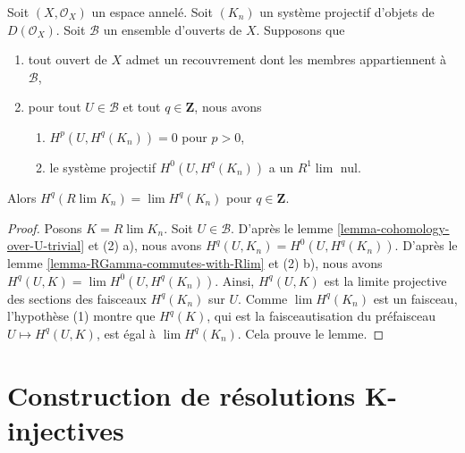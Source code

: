 \begin{lemma}

\label{lemma-derived-limit-suitable-system}

Soit $(X, \mathcal{O}_X)$ un espace annelé. Soit $(K_n)$
un système projectif d'objets de $D(\mathcal{O}_X)$. Soit $\mathcal{B}$ un ensemble d'ouverts de $X$. Supposons que

\begin{enumerate}

\item tout ouvert de $X$ admet un recouvrement dont les membres appartiennent à $\mathcal{B}$,
\item pour tout $U \in \mathcal{B}$ et tout $q \in \mathbf{Z}$, nous avons

\begin{enumerate}

\item  $H^p(U, H^q(K_n)) = 0$ pour $p > 0$,
\item le système projectif $H^0(U, H^q(K_n))$ a un $R^1\lim$ nul.

\end{enumerate}

\end{enumerate}

Alors $H^q(R\lim K_n) = \lim H^q(K_n)$ pour $q \in \mathbf{Z}$.

\end{lemma}

\begin{proof}

Posons $K = R\lim K_n$. Soit $U \in \mathcal{B}$. D'après le lemme \ref{lemma-cohomology-over-U-trivial} et (2) a), nous avons $H^q(U, K_n) = H^0(U, H^q(K_n))$. D'après le lemme \ref{lemma-RGamma-commutes-with-Rlim} et (2) b), nous avons 
$H^q(U, K) = \lim H^0(U, H^q(K_n))$. Ainsi, $H^q(U, K)$ est la limite projective des sections des faisceaux $H^q(K_n)$ sur $U$. Comme
$\lim H^q(K_n)$ est un faisceau, l'hypothèse (1) montre que $H^q(K)$, qui est la faisceautisation du préfaisceau $U \mapsto H^q(U, K)$, est égal à $\lim H^q(K_n)$. Cela prouve le lemme.

\end{proof}







\section{Construction de résolutions K-injectives}


